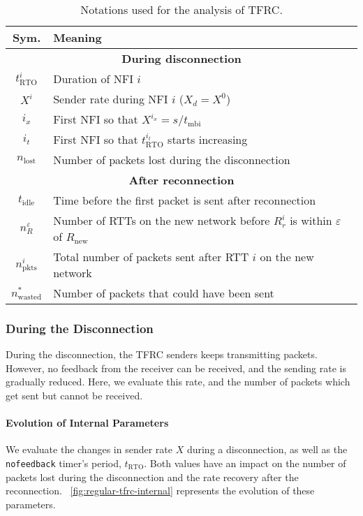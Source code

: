 \documentclass[twocolumn]{nictatechreport}
\begin{document}
\begin{table}[tb]
  \centering

  \caption[Notations for TFRC modelling]{Notations used for the analysis of
  TFRC.}

  \label{tab:notations}
  \addtolength{\tabcolsep}{-1ex}
  \begin{tabular}{cp{7.5cm}}
    \toprule
    \textbf{Sym.} & \hfill\textbf{Meaning}\hfill\strut \\
    \midrule
    \multicolumn{2}{c}{\textbf{During disconnection}} \\
    \cmidrule{1-2}
    $t_\mathrm{RTO}^i$ & Duration of NFI $i$ \\
    $X^i$ & Sender rate during NFI $i$ ($X_d = X^0$) \\
    $i_x$ & First NFI so that $X^{i_x} = s/t_\mathrm{mbi}$ \\
    $i_t$ & First NFI so that $t_\mathrm{RTO}^{i_t}$ starts increasing \\
    $n_\mathrm{lost}$ & Number of packets lost during the disconnection \\
    \cmidrule{1-2}
    \multicolumn{2}{c}{\textbf{After reconnection}} \\
    \cmidrule{1-2}
$t_\mathrm{idle}$ & Time before the first packet is sent after reconnection\\
$n_R^\varepsilon$ & Number of RTTs on the new network before $R_r^i$ is within $\varepsilon$ of $R_\mathrm{new}$ \\
    $n_\mathrm{pkts}^i$ & Total number of packets sent after RTT $i$ on the new network \\
$n_\mathrm{wasted}^*$ & Number of packets that could have been sent \\
    \bottomrule
  \end{tabular}
\end{table}

\subsubsection{During the Disconnection}

During the disconnection, the TFRC senders keeps transmitting packets. However,
no feedback from the receiver can be received, and the sending rate is
gradually reduced. Here, we evaluate this rate, and the number of packets which
get sent but cannot be received.

\paragraph{Evolution of Internal Parameters} We evaluate the changes in sender
rate $X$ during a disconnection, as well as the \verb#nofeedback# timer's
period, $t_\mathrm{RTO}$. Both values have an impact on the number of packets
lost during the disconnection and the rate recovery after the reconnection.
\figurename~\ref{fig:regular-tfrc-internal} represents the evolution of these
parameters.
\end{document}
